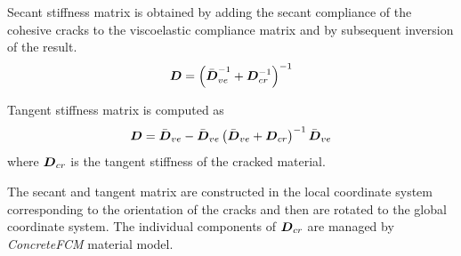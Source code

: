 \documentclass[a4paper]{article}
\newcommand{\mbf}[1]{\mbox{\boldmath$#1$}}
\begin{document}
Secant stiffness matrix is obtained by adding the secant compliance of
the cohesive cracks to the viscoelastic compliance matrix and by subsequent
inversion of the result. 
%
\begin{equation}
\mbf{D} =   \left( \bar{\mbf{D}}^{-1}_{ve} + \mbf{D}^{-1}_{cr}  \right)^{-1}
\end{equation}

Tangent stiffness matrix is computed as 
\begin{equation}
\mbf{D} = \bar{\mbf{D}}_{ve} - \bar{\mbf{D}}_{ve} \left(\bar{\mbf{D}}_{ve} + \mbf{D}_{cr} \right)^{-1} \bar{\mbf{D}}_{ve}
\end{equation}
where $\mbf{D}_{cr}$ is the tangent stiffness of the cracked material.

The secant and tangent matrix are constructed in the local
coordinate system corresponding to the orientation of the cracks and
then are rotated to the global
coordinate system. The individual components of $\mbf{D}_{cr}$ are managed by
\emph{ConcreteFCM} material model.
\end{document}
